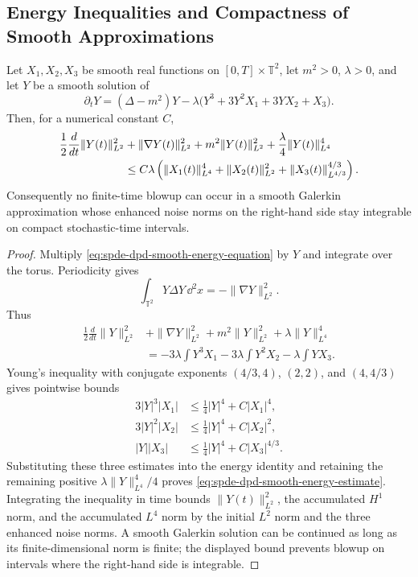\subsection{Energy Inequalities and Compactness of Smooth Approximations}
\label{subsec:spde-dpd-energy-compactness}

\begin{lemma}
\label{lem:spde-dpd-smooth-energy-estimate}
Let \(X_1,X_2,X_3\) be smooth real functions on
\([0,T]\times\mathbb T^2\), let \(m^2>0\), \(\lambda>0\), and let \(Y\) be
a smooth solution of
\begin{equation}
  \partial_tY
  =
  (\Delta-m^2)Y
  -\lambda\bigl(Y^3+3Y^2X_1+3YX_2+X_3\bigr).
  \label{eq:spde-dpd-smooth-energy-equation}
\end{equation}
Then, for a numerical constant \(C\),
\begin{align}
  \frac12\frac{d}{dt}\|Y(t)\|_{L^2}^2
  &+
  \|\nabla Y(t)\|_{L^2}^2
  +m^2\|Y(t)\|_{L^2}^2
  +\frac{\lambda}{4}\|Y(t)\|_{L^4}^4
  \notag\\
  &\leq
  C\lambda
  \left(
    \|X_1(t)\|_{L^4}^4
    +\|X_2(t)\|_{L^2}^2
    +\|X_3(t)\|_{L^{4/3}}^{4/3}
  \right).
  \label{eq:spde-dpd-smooth-energy-estimate}
\end{align}
Consequently no finite-time blowup can occur in a smooth Galerkin
approximation whose enhanced noise norms on the right-hand side stay
integrable on compact stochastic-time intervals.
\end{lemma}

\begin{proof}
Multiply \eqref{eq:spde-dpd-smooth-energy-equation} by \(Y\) and integrate
over the torus.  Periodicity gives
\[
  \int_{\mathbb T^2}Y\Delta Y\,\dd^2x
  =
  -\|\nabla Y\|_{L^2}^2 .
\]
Thus
\[
\begin{aligned}
  \frac12\frac{d}{dt}\|Y\|_{L^2}^2
  &+
  \|\nabla Y\|_{L^2}^2
  +m^2\|Y\|_{L^2}^2
  +\lambda\|Y\|_{L^4}^4 \\
  &=
  -3\lambda\int Y^3X_1
  -3\lambda\int Y^2X_2
  -\lambda\int YX_3 .
\end{aligned}
\]
Young's inequality with conjugate exponents \((4/3,4)\), \((2,2)\), and
\((4,4/3)\) gives pointwise bounds
\[
\begin{aligned}
  3|Y|^3|X_1|
  &\leq \frac14 |Y|^4+C|X_1|^4,\\
  3|Y|^2|X_2|
  &\leq \frac14 |Y|^4+C|X_2|^2,\\
  |Y||X_3|
  &\leq \frac14 |Y|^4+C|X_3|^{4/3}.
\end{aligned}
\]
Substituting these three estimates into the energy identity and retaining
the remaining positive \(\lambda\|Y\|_{L^4}^4/4\) proves
\eqref{eq:spde-dpd-smooth-energy-estimate}.  Integrating the inequality in
time bounds \(\|Y(t)\|_{L^2}^2\), the accumulated \(H^1\) norm, and the
accumulated \(L^4\) norm by the initial \(L^2\) norm and the three enhanced
noise norms.  A smooth Galerkin solution can be continued as long as its
finite-dimensional norm is finite; the displayed bound prevents blowup on
intervals where the right-hand side is integrable.
\end{proof}

